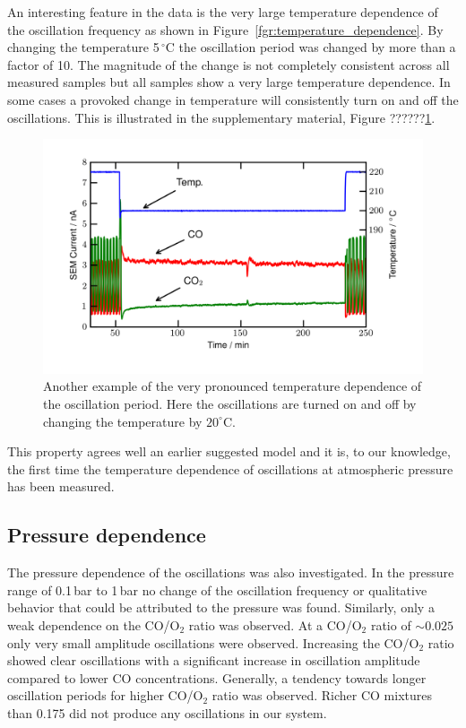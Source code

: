 \documentclass[journal=jacsat,manuscript=article]{achemso}
\begin{document}
An interesting feature in the data is the very large temperature dependence of the
oscillation frequency as shown in Figure~\ref{fgr:temperature_dependence}. By
changing the temperature 5\,$^\circ$C the oscillation period was changed by more
than a factor of 10. The magnitude of the change is not completely consistent
across all measured samples but all samples show a very large temperature
dependence. In some cases a provoked change in temperature will
consistently turn on and off the oscillations. This is illustrated in the supplementary
material, Figure ??????\ref{fgr:temperature_dependence_supplemental}.
\begin{figure}
\centering
  \includegraphics[width=12cm]{temperature_dependence_supplemental.png}
  \caption{Another example of the very pronounced temperature dependence of the oscillation period.
  Here the oscillations are turned on and off by changing the temperature by
  $20^\circ$C.}
  \label{fgr:temperature_dependence_supplemental}
\end{figure}
This property agrees well an earlier suggested model \cite{Hendriksen2010} and
it is, to our knowledge, the first time the temperature dependence of
oscillations at atmospheric pressure has been measured.

\subsection{Pressure dependence}
The pressure dependence of the oscillations was also investigated. In the
pressure range of 0.1\,bar to 1\,bar no change of the oscillation frequency or
qualitative behavior that could be attributed to the pressure was found.
Similarly, only a weak dependence on the CO/O$_2$ ratio was observed. At a
CO/O$_2$ ratio of $\sim0.025$ only very small amplitude oscillations were
observed. Increasing the CO/O$_2$ ratio showed clear oscillations with a significant
increase in oscillation amplitude compared to lower CO concentrations.
Generally, a tendency towards longer oscillation periods for higher CO/O$_2$
ratio was observed. Richer CO mixtures than 0.175 did not produce any
oscillations in our system.
\end{document}
